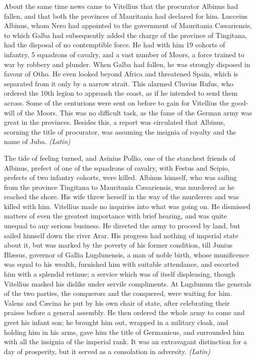 About the same time news came to Vitellius that the procurator Albinus had fallen, and that both the provinces of Mauritania had declared for him. Lucceius Albinus, whom Nero had appointed to the government of Mauritania Cæsariensis, to which Galba had subsequently added the charge of the province of Tingitana, had the disposal of no contemptible force. He had with him 19 cohorts of infantry, 5 squadrons of cavalry, and a vast number of Moors, a force trained to war by robbery and plunder. When Galba had fallen, he was strongly disposed in favour of Otho. He even looked beyond Africa and threatened Spain, which is separated from it only by a narrow strait. This alarmed Cluvius Rufus, who ordered the 10th legion to approach the coast, as if he intended to send them across. Some of the centurions were sent on before to gain for Vitellius the good-will of the Moors. This was no difficult task, as the fame of the German army was great in the provinces. Besides this, a report was circulated that Albinus, scorning the title of procurator, was assuming the insignia of royalty and the name of Juba. \emph{(Latin)}


The tide of feeling turned, and Asinius Pollio, one of the stanchest friends of Albinus, prefect of one of the squadrons of cavalry, with Festus and Scipio, prefects of two infantry cohorts, were killed. Albinus himself, who was sailing from the province Tingitana to Mauritania Cæsariensis, was murdered as he reached the shore. His wife threw herself in the way of the murderers and was killed with him. Vitellius made no inquiries into what was going on. He dismissed matters of even the greatest importance with brief hearing, and was quite unequal to any serious business. He directed the army to proceed by land, but sailed himself down the river Arar. His progress had nothing of imperial state about it, but was marked by the poverty of his former condition, till Junius Blæsus, governor of Gallia Lugdunensis, a man of noble birth, whose munificence was equal to his wealth, furnished him with suitable attendance, and escorted him with a splendid retinue; a service which was of itself displeasing, though Vitellius masked his dislike under servile compliments. At Lugdunum the generals of the two parties, the conquerors and the conquered, were waiting for him. Valens and Cæcina he put by his own chair of state, after celebrating their praises before a general assembly. He then ordered the whole army to come and greet his infant son; he brought him out, wrapped in a military cloak, and holding him in his arms, gave him the title of Germanicus, and surrounded him with all the insignia of the imperial rank. It was an extravagant distinction for a day of prosperity, but it served as a consolation in adversity. \emph{(Latin)}

